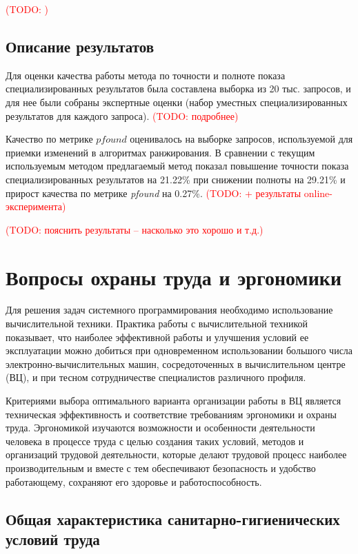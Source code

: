 \documentclass[12pt,a4paper]{report}
\newcommand\note[1]{\textcolor{red}{(#1)}}
\newcommand\todonote[1]{\note{TODO: #1}}
\begin{document}
\todonote{}

\section{Описание результатов}

Для оценки качества работы метода по точности и полноте показа специализированных результатов была составлена выборка из 20 тыс. запросов, и для нее были собраны экспертные оценки (набор уместных специализированных результатов для каждого запроса). 
\todonote{подробнее}

Качество по метрике $pfound$ оценивалось на выборке запросов, используемой для приемки изменений в алгоритмах ранжирования.
В сравнении с текущим используемым методом предлагаемый метод показал повышение точности показа специализированных результатов на 21.22\% при снижении полноты на 29.21\% и прирост качества по метрике \textit{pfound} на 0.27\%. \todonote{+ результаты online-эксперимента}


\todonote{пояснить результаты -- насколько это хорошо и т.д.}

\chapter{Вопросы охраны труда и эргономики}

Для решения задач системного программирования необходимо использование вычислительной техники. Практика работы с вычислительной техникой показывает, что наиболее эффективной работы и улучшения условий ее эксплуатации можно добиться при одновременном использовании большого числа электронно-вычислительных машин, сосредоточенных в вычислительном центре (ВЦ), и при тесном сотрудничестве специалистов различного профиля.\\
\par Критериями выбора оптимального варианта организации работы в ВЦ является техническая эффективность и соответствие требованиям эргономики и охраны труда. Эргономикой изучаются возможности и особенности деятельности человека в процессе труда с целью создания таких условий, методов и организаций трудовой деятельности, которые делают трудовой процесс наиболее производительным и вместе с тем обеспечивают безопасность и удобство работающему, сохраняют его здоровье и работоспособность.\\


\section{Общая характеристика санитарно-гигиенических условий труда}
\end{document}

